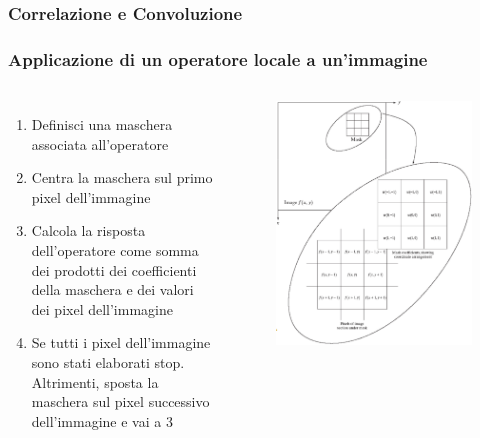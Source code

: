 \subsubsection[Correlazione e Convoluzione]{Correlazione e Convoluzione}
\begin{frame}

	\frametitle{Applicazione di un operatore locale a un'immagine}

		\begin{columns}
		  	\begin{enumerate}
				\item Definisci una maschera associata all'operatore
				\item Centra la maschera sul primo pixel dell'immagine
				\item Calcola la risposta dell'operatore come somma dei prodotti dei coefficienti della maschera e dei valori dei pixel dell'immagine
				\item Se tutti i pixel dell'immagine sono stati elaborati stop.\\	Altrimenti, sposta la maschera sul pixel successivo dell'immagine e vai a 3
			\end{enumerate}

			\begin{figure}[!htbp]
				\centering
				\includegraphics[width=0.95\linewidth]{images/supervised/z_algorithms_deep_learning/convolution_and_correlation_1.png}
			\end{figure}

		\end{columns}

\end{frame}


